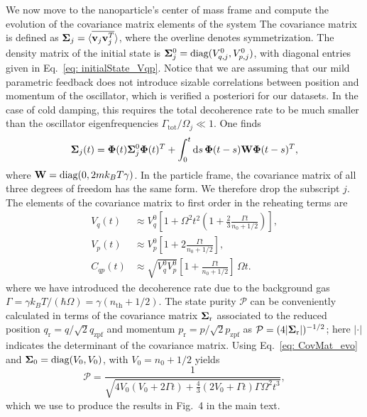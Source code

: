 \documentclass[aps,amssymb,amsmath,prb,superscriptaddress,reprint,notitlepage,onecolumn]{revtex4-1}
\newcommand{\<}{\langle}
\renewcommand{\>}{\rangle}
\begin{document}
We now move to the nanoparticle's center of mass frame and compute the evolution of the covariance matrix elements of the system
%
The covariance matrix is defined as $\vb{\Sigma}_j=\langle \overline{\vb{v}_j\vb{v}_j^T}\rangle$, where the overline denotes symmetrization.
%
The density matrix of the initial state is $\vb{\Sigma}_{j}^0=\text{diag}(V^0_{q,j},V^0_{p,j})$, with diagonal entries given in Eq.~\ref{eq: initialState_Vqp}.
%
Notice that we are assuming that our mild parametric feedback does not introduce sizable correlations between position and momentum of the oscillator, which is verified a posteriori for our datasets.
%
In the case of cold damping, this requires the total decoherence rate to be much smaller than the oscillator eigenfrequencies $\Gamma_\text{tot}/\Omega_j\ll 1$. One finds
%
\begin{equation}\label{eq: CovMat_evo}
	\vb{\Sigma}_j(t)=\vb{\Phi}(t)\vb{\Sigma}_j^0\vb{\Phi}(t)^T+\int_0^t \dd s \, \vb{\Phi}(t-s)\vb{W}\vb{\Phi}(t-s)^T, 
\end{equation}
%
where $\vb{W}=\text{diag}(0,2mk_B T \gamma)$.
%
In the particle frame, the covariance matrix of all three degrees of freedom has the same form.
%
We therefore drop the subscript $j$.
%
The elements of the covariance matrix to first order in the reheating terms are
%
\begin{equation}\label{eq: cov_FF}
\begin{aligned}
	V_q(t)&\approx V_q^0 \left[ 1 + \Omega^2 t^2\left(1+\frac{2}{3}\frac{\Gamma t}{n_0+1/2}\right) \right],\\
	V_p(t)&\approx V_p^0 \left[1+2\frac{\Gamma t}{n_0+1/2} \right],\\
	C_{qp}(t)&\approx\sqrt{V_q^0V_p^0}\left[1+\frac{\Gamma t}{n_0+1/2}\right]\,\Omega t.
\end{aligned}
\end{equation}
%
where we have introduced the decoherence rate due to the background gas $\Gamma=\gamma k_B T/(\hbar\Omega)=\gamma(n_\text{th}+1/2)$.
%
The state purity $\mathcal{P}$ can be conveniently calculated in terms of the covariance matrix $\vb{\Sigma}_\text{r}$ associated to the reduced position $q_\text{r}=q/\sqrt{2}q_\text{zpf}$ and momentum $p_\text{r}=p/\sqrt{2}p_\text{zpf}$ as $\mathcal{P}=(4|\vb{\Sigma}_\text{r}|)^{-1/2}$; here $|\cdot|$ indicates the determinant of the covariance matrix.
%
Using Eq.~\ref{eq: CovMat_evo} and $\vb{\Sigma}_{0}=\text{diag}(V_0,V_0)$, with $V_0=n_0+1/2$ yields
%
\begin{equation}\label{eq: statePurity_FF}
	\mathcal{P}=\frac{1}{\sqrt{4V_0(V_0+2\Gamma t)+\frac{4}{3}(2V_0+\Gamma t)\Gamma\Omega^2 t^3 }},
\end{equation}
%
which we use to produce the results in Fig.~4 in the main text.
\end{document}
